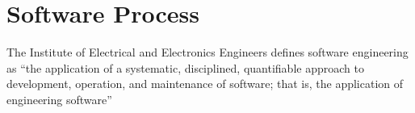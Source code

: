 \section{Software Process}
The Institute of Electrical and Electronics Engineers defines software engineering as 
“the application of a systematic, disciplined, quantifiable approach to development, 
operation, and maintenance of software; that is, the application of engineering software”
